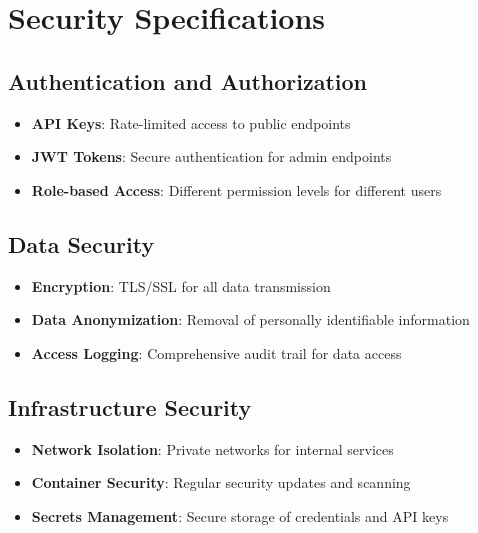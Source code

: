 
\section{Security Specifications}

\subsection{Authentication and Authorization}
\begin{itemize}
\item \textbf{API Keys}: Rate-limited access to public endpoints
\item \textbf{JWT Tokens}: Secure authentication for admin endpoints
\item \textbf{Role-based Access}: Different permission levels for different users
\end{itemize}

\subsection{Data Security}
\begin{itemize}
\item \textbf{Encryption}: TLS/SSL for all data transmission
\item \textbf{Data Anonymization}: Removal of personally identifiable information
\item \textbf{Access Logging}: Comprehensive audit trail for data access
\end{itemize}

\subsection{Infrastructure Security}
\begin{itemize}
\item \textbf{Network Isolation}: Private networks for internal services
\item \textbf{Container Security}: Regular security updates and scanning
\item \textbf{Secrets Management}: Secure storage of credentials and API keys
\end{itemize}

